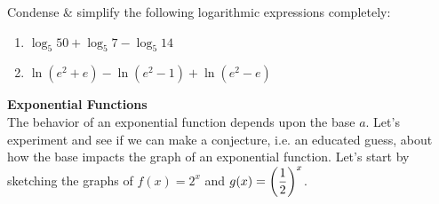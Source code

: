 \documentclass[10pt]{article}
\begin{document}
    \vfill
    \vfill
    
 Condense \& simplify the following logarithmic expressions completely:
\begin{enumerate}
\item[(a)] $\log_5 50+\log_5 7-\log_5 14$
    \vfill\vfill
\item[(b)] $\ln(e^2+e)-\ln(e^2-1)+\ln(e^2-e)$\\[0.3in]
    \vfill
    \vfill
\end{enumerate}

\newpage%





{\bf Exponential  Functions}\\

The behavior of an exponential function depends upon  the base $a$. Let's experiment and see if we can make a conjecture, i.e. an educated guess, about how the base impacts the graph of an exponential function. Let's start by sketching the graphs of $f(x)=2^x$ and $\displaystyle g(x)=\left(\frac12\right)^x$.

\end{document}
